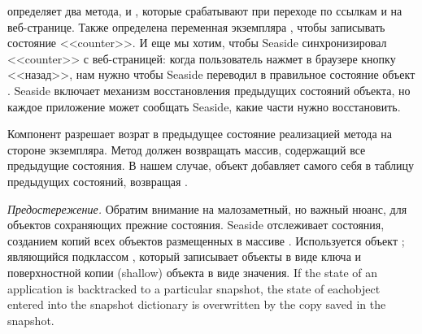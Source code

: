 \documentclass[a4paper,10pt,twoside]{book}
\begin{document}
 определяет два метода,  и ,
которые срабатывают при переходе по ссылкам \link{++} и \link{--\,--}
на веб-странице.
Также определена переменная экземпляра ,
чтобы записывать состояние <<counter>>.
И еще мы хотим, чтобы Seaside синхронизировал <<counter>> с веб-страницей: когда пользователь нажмет в браузере кнопку <<назад>>,
нам нужно чтобы Seaside переводил в правильное состояние объект .
Seaside включает механизм восстановления предыдущих состояний объекта, но каждое приложение может сообщать Seaside, какие части нужно восстановить.


Компонент разрешает возрат в предыдущее состояние реализацией метода 
на стороне экземпляра.
Метод  должен возвращать массив, содержащий все предыдущие состояния.
В нашем случае, объект  добавляет самого себя в таблицу предыдущих состояний,
возвращая .


\emph{Предостережение.}
Обратим внимание на малозаметный, но важный нюанс,
для объектов сохраняющих прежние состояния.
Seaside отслеживает состояния, созданием копий всех объектов размещенных в массиве .
Используется объект ; являющийся подклассом ,
который записывает объекты в виде ключа и поверхностной копии (shallow) объекта в виде значения.
If the state of an application is backtracked to a particular snapshot,
the state of eachobject entered into the snapshot dictionary
is overwritten by the copy saved in the snapshot.
\end{document}

